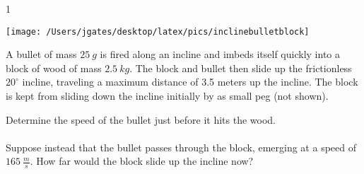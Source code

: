 
\AddToShipoutPicture*{\BackgroundPic}

\addtocounter {ProbNum} {1}

\begin{floatingfigure}[r]{.42\textwidth}
\texttt{[image: /Users/jgates/desktop/latex/pics/inclinebulletblock]}
\end{floatingfigure}
 
{\bf \Large{}} A bullet of mass $25~g$ is fired along an incline and imbeds itself quickly into a block of wood of mass $2.5~kg$. The block and bullet then slide up the frictionless $20^{\circ}$ incline, traveling a maximum distance of 3.5 meters up the incline. The block is kept from sliding down the incline initially by as small peg (not shown).

\bigskip
Determine the speed of the bullet just before it hits the wood.\paragraph{}
\noindent
\vfill

Suppose instead that the bullet passes through the block, emerging at a speed of ${165~\tfrac{m}{s}}$.  How far would the block slide up the incline now?
\vfill
\newpage